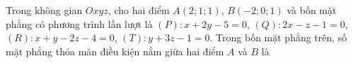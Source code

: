 \begin{ex}
Trong không gian $Oxyz$, cho hai điểm $A(2;1;1)$, $B(-2;0;1)$ và bốn mặt phẳng có phương trình lần lượt là $(P)\colon x+2y-5=0$, $(Q)\colon 2x-z-1=0$, $(R)\colon x+y-2z-4=0$, $(T)\colon y+3z-1=0$. Trong bốn mặt phẳng trên, số mặt phẳng thỏa mãn điều kiện nằm giữa hai điểm $A$ và $B$ là
\end{ex}
